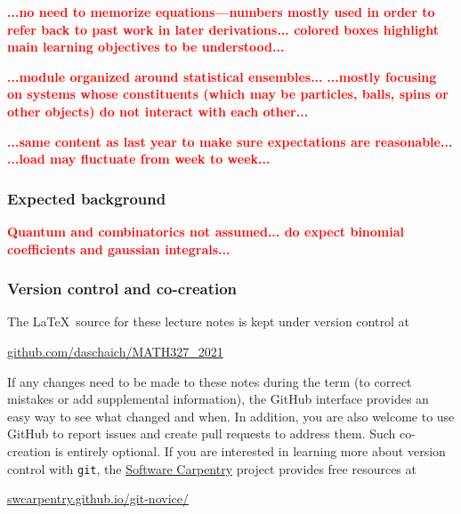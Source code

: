 \documentclass[12 pt]{article} %
\newcommand{\TODO}[1]{\textcolor{red}{\textbf{#1}}}
\begin{document}
\TODO{...no need to memorize equations---numbers mostly used in order to refer back to past work in later derivations... colored boxes highlight main learning objectives to be understood...}

\TODO{...module organized around statistical ensembles...}
\TODO{...mostly focusing on systems whose constituents (which may be particles, balls, spins or other objects) do not interact with each other...}

\TODO{...same content as last year to make sure expectations are reasonable...} %
\TODO{...load may fluctuate from week to week...}

\subsubsection*{Expected background}
\TODO{Quantum and combinatorics not assumed... do expect binomial coefficients and gaussian integrals...}

\subsubsection*{Version control and co-creation}
The \LaTeX\ source for these lecture notes is kept under version control at \\
\centerline{\href{https://github.com/daschaich/MATH327_2021}{github.com/daschaich/MATH327\_2021}}
If any changes need to be made to these notes during the term (to correct mistakes or add supplemental information), the GitHub interface provides an easy way to see what changed and when.
In addition, you are also welcome to use GitHub to report issues and create pull requests to address them.
Such co-creation is entirely optional.
If you are interested in learning more about version control with \texttt{git}, the \href{https://software-carpentry.org}{Software Carpentry} project provides free resources at \\
\centerline{\href{https://swcarpentry.github.io/git-novice/}{swcarpentry.github.io/git-novice/}}



\end{document}
